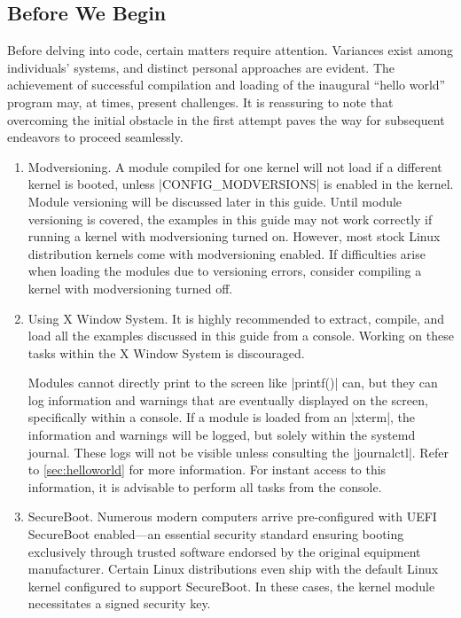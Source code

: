 \documentclass[10pt, oneside]{book}
\begin{document}
\subsection{Before We Begin}
\label{sec:preparation}
Before delving into code, certain matters require attention.
Variances exist among individuals' systems, and distinct personal approaches are evident.
The achievement of successful compilation and loading of the inaugural ``hello world'' program may,
at times, present challenges.
It is reassuring to note that overcoming the initial obstacle in the first attempt paves the way for subsequent endeavors to proceed seamlessly.

\begin{enumerate}
  \item Modversioning.
        A module compiled for one kernel will not load if a different kernel is booted,
        unless \cpp|CONFIG_MODVERSIONS| is enabled in the kernel.
        Module versioning will be discussed later in this guide.
        Until module versioning is covered, the examples in this guide may not work correctly if running a kernel with modversioning turned on.
        However, most stock Linux distribution kernels come with modversioning enabled.
        If difficulties arise when loading the modules due to versioning errors, consider compiling a kernel with modversioning turned off.

  \item Using X Window System.
        It is highly recommended to extract, compile, and load all the examples discussed in this guide from a console.
        Working on these tasks within the X Window System is discouraged.

        Modules cannot directly print to the screen like \cpp|printf()| can,
        but they can log information and warnings that are eventually displayed on the screen,
        specifically within a console.
        If a module is loaded from an \sh|xterm|, the information and warnings will be logged,
        but solely within the systemd journal. These logs will not be visible unless consulting the \sh|journalctl|.
        Refer to \ref{sec:helloworld} for more information.
        For instant access to this information, it is advisable to perform all tasks from the console.
  \item SecureBoot.
        Numerous modern computers arrive pre-configured with UEFI SecureBoot enabled—an essential security standard ensuring booting exclusively through trusted software endorsed by the original equipment manufacturer.
        Certain Linux distributions even ship with the default Linux kernel configured to support SecureBoot.
        In these cases, the kernel module necessitates a signed security key.


\end{enumerate}
\end{document}
